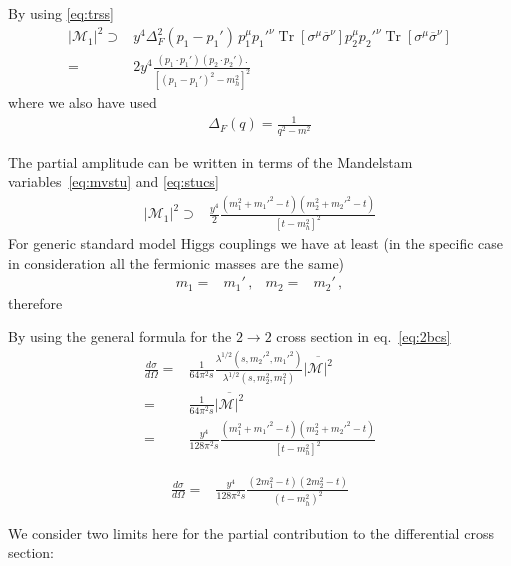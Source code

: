 By using \eqref{eq:trss}
\begin{align}
  \left| \mathcal{M}_1 \right|^2 \supset & y^4  \Delta_F^2(p_1-p_1')\,p_1^{\mu}{p_1'}^{\nu}\operatorname{Tr} \left[  \sigma^{\mu}  \overline{\sigma}^{\nu} \right] p_2^{\mu}{p_2'}^{\nu} \operatorname{Tr}\left[\sigma^{\mu} \overline{\sigma}^{\nu} \right]\nonumber\\
= & 2y^4  \frac{\left( p_1\cdot p_1' \right) \left( p_2\cdot{p_2'} \right).}{\left[ \left(p_1-p_1'\right)^2-m^2_h \right]^2}\,
\end{align}
where we also have used
\begin{align}
  \Delta_F(q)=\frac{1}{q^2-m^2}
\end{align}

The partial amplitude can be written in terms of the Mandelstam variables~\eqref{eq:mvstu} and \eqref{eq:stucs}
\begin{align}
  \left| \mathcal{M}_1 \right|^2  \supset & \frac{y^4}{2}  \frac{ \left(m_1^2+{m_1'}^2-t  \right)\left( m_2^2+{m_2'}^2-t \right)}{\left[ t-m^2_h \right]^2}
\end{align}
For generic standard model Higgs couplings we have at least (in the specific case in consideration all the fermionic masses are the same) 
\begin{align}
  m_1=&m_1'\,,&m_2=&m_2'\,,
\end{align}
therefore

By using the general formula for the $2\to 2$ cross section in eq.~\eqref{eq:2bcs}
\begin{align}
  \frac{d\sigma}{d\Omega}=&\frac{1}{64\pi^2s}
\frac{\lambda^{1/2}(s,{m_2'}^2,{m_1'}^2)}{\lambda^{1/2}(s,m_2^2,m_1^2)}
\overline{|\mathcal{M}|^2} \nonumber\\
=&\frac{1}{64\pi^2s}
\overline{|\mathcal{M}|^2} \nonumber\\
=&\frac{y^4}{128\pi^2s}
 \frac{ \left(m_1^2+{m_1'}^2-t  \right)\left( m_2^2+{m_2'}^2-t \right)}{\left[ t-m^2_h \right]^2}
\end{align}

\begin{align}
    \frac{d\sigma}{d\Omega}
=&\frac{y^4}{128\pi^2s}
  \frac{ \left(2m_1^2-t  \right)\left( 2m_2^2-t \right)}{\left(t-m^2_h\right)^2}
\end{align}

We consider two limits here for the partial contribution to the differential cross section:

